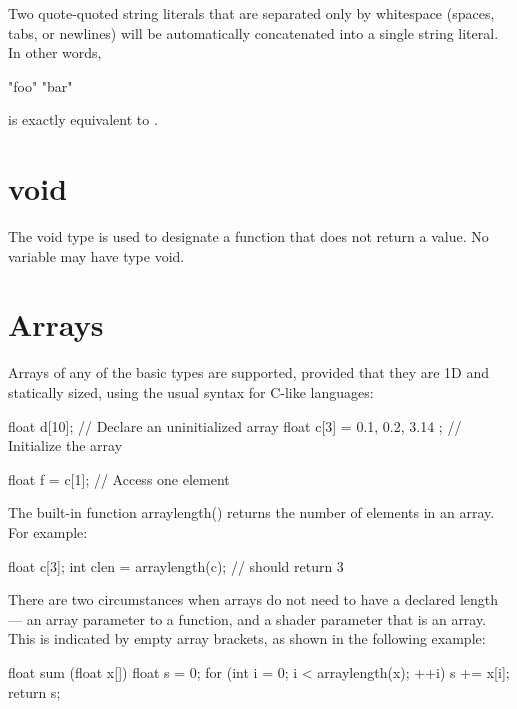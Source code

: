 \documentclass[11pt,letterpaper]{book}
\def\void{{\cf void}\xspace}
\begin{document}
Two quote-quoted string literals that are separated only by whitespace
(spaces, tabs, or newlines) will be automatically concatenated into a
single string literal.  In other words,
\begin{code}
      "foo"  "bar"
\end{code}
\noindent is exactly equivalent to .

\section{\void}
\label{sec:types:void}
 

The \void type is used to designate a function that does not return
a value.  No variable may have type \void.

\section{Arrays}
\label{sec:types:arrays}
 

Arrays of any of the basic types are supported, provided that they
are 1D and statically sized, using the usual syntax for C-like languages:

\begin{code}
    float d[10];                       // Declare an uninitialized array
    float c[3] = { 0.1, 0.2, 3.14 };   // Initialize the array

    float f = c[1];                    // Access one element
\end{code}

The built-in function {\cf arraylength()} returns the number of elements
in an array.  For example:

\begin{code}
    float c[3];
    int clen = arraylength(c);        // should return 3
\end{code}

There are two circumstances when arrays do not need to have a declared
length --- an array parameter to a function, and a shader parameter that
is an array.  This is indicated by empty array brackets, as shown in the
following example:

\begin{code}
    float sum (float x[])
    {
        float s = 0;
        for (int i = 0;  i < arraylength(x);  ++i)
            s += x[i];
        return s;
    }
\end{code}
\end{document}
